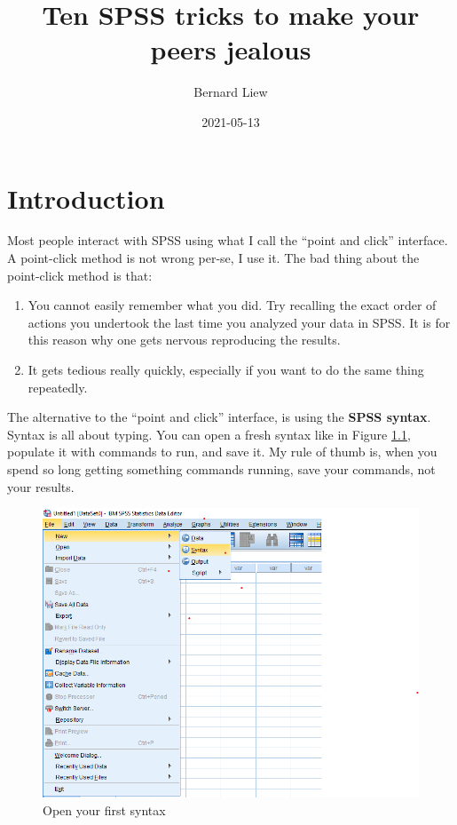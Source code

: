 \documentclass[
]{book}
\title{Ten SPSS tricks to make your peers jealous}
\author{Bernard Liew}
\date{2021-05-13}
\begin{document}
\maketitle

{
\setcounter{tocdepth}{1}
\tableofcontents
}
\hypertarget{introduction}{%
\chapter{Introduction}\label{introduction}}

Most people interact with SPSS using what I call the ``point and click'' interface. A point-click method is not wrong per-se, I use it. The bad thing about the point-click method is that:

\begin{enumerate}
\def\labelenumi{\arabic{enumi})}
\item
  You cannot easily remember what you did. Try recalling the exact order of actions you undertook the last time you analyzed your data in SPSS. It is for this reason why one gets nervous reproducing the results.
\item
  It gets tedious really quickly, especially if you want to do the same thing repeatedly.
\end{enumerate}

The alternative to the ``point and click'' interface, is using the \textbf{SPSS syntax}. Syntax is all about typing. You can open a fresh syntax like in Figure \ref{fig:first-syntax}, populate it with commands to run, and save it. My rule of thumb is, when you spend so long getting something commands running, save your commands, not your results.

\begin{figure}
\includegraphics[width=1\linewidth]{images/open_syntax} \caption{Open your first syntax}\label{fig:first-syntax}
\end{figure}
\end{document}
